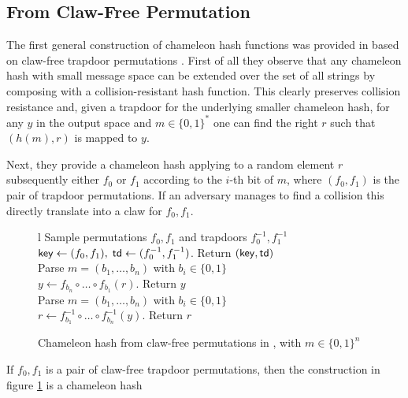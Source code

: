 
\subsection{From Claw-Free Permutation}

The first general construction of chameleon hash functions was provided in \cite{NDSS:KraRab00} based on claw-free trapdoor permutations . 
First of all they observe that any chameleon hash with small message space can be extended over the set of all strings by composing with a collision-resistant hash function.
This clearly preserves collision resistance and, given a trapdoor for the underlying smaller chameleon hash, for any $y$ in the output space and $m \in \{0, 1\}^\ast$ one can find the right $r$ such that $(h(m), r)$ is mapped to $y$.

Next, they provide a chameleon hash applying to a random element $r$ subsequently either $f_0$ or $f_1$ according to the $i$-th bit of $m$, where $(f_0, f_1)$ is the pair of trapdoor permutations.
If an adversary manages to find a collision this directly translate into a claw for $f_0, f_1$.

\begin{figure}[htb]
\centering
\begin{pcarray}{l}
		{
			Sample permutations $f_0, f_1$ and trapdoors $f_0^{-1}, f_1^{-1}$
				\\
			$\mathsf{key} \gets (f_0, f_1), \; \mathsf{td} \gets (f_0^{-1}, f_1^{-1})$.
			Return $(\mathsf{key}, \mathsf{td})$
		}
		\\
		{
			Parse $m = (b_1, \ldots, b_n)$ with $b_i \in \{0, 1\}$
				\\
			$y \gets f_{b_n} \circ \ldots \circ f_{b_1} (r)$. Return $y$
		}
		\\
		{
			Parse $m = (b_1, \ldots, b_n)$ with $b_i \in \{0, 1\}$
				\\
			$r \gets f_{b_1}^{-1} \circ \ldots \circ f_{b_n}^{-1}(y)$. Return $r$
		}
\end{pcarray}
\caption{Chameleon hash from claw-free permutations in \cite{NDSS:KraRab00}, with $m \in \{0, 1\}^n$}
\label{prot:KraRab:trapdoor_permutations}
\end{figure}

\begin{proposition}
	If $f_0, f_1$ is a pair of claw-free trapdoor permutations, then the construction in figure \ref{prot:KraRab:trapdoor_permutations} is a chameleon hash
\end{proposition}


